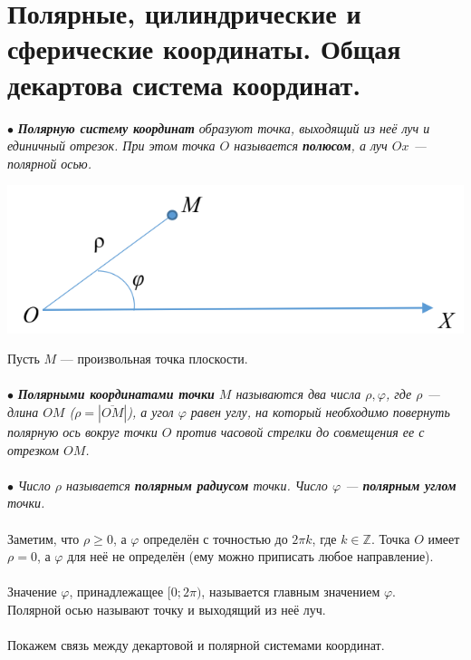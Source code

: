 \section{Полярные, цилиндрические и сферические координаты. Общая декартова система координат.}
$\bullet$ \textit{\textbf{Полярную систему координат} образуют точка, выходящий из неё луч и единичный отрезок. При этом точка $O$ называется \textbf{полюсом}, а луч $Ox$ --- полярной осью.}\begin{center}
	\includegraphics[scale=0.4]{images/polar.png}
\end{center}
Пусть $M$ --- произвольная точка плоскости.\\\\
$\bullet$ \textit{\textbf{Полярными координатами точки} $M$ называются два числа $\rho, \varphi$, где $\rho$ --- длина $OM$ ($\rho = |\overline{OM}|$), а угол $\varphi$ равен углу, на который необходимо повернуть полярную ось вокруг точки $O$ против часовой стрелки до совмещения ее с отрезком $OM$.}\\\\
$\bullet$ \textit{Число $\rho$ называется \textbf{полярным радиусом} точки. Число $\varphi$ --- \textbf{полярным углом} точки.}\\\\
Заметим, что $\rho \geqslant 0$, а $\varphi$ определён с точностью до $2\pi k$, где $k\in \mathbb{Z}$. Точка $O$ имеет $\rho = 0$, а $\varphi$ для неё не определён (ему можно приписать любое направление).\\\\
Значение $\varphi$, принадлежащее $[0;2\pi)$, называется главным значением $\varphi$.\\
Полярной осью называют точку и выходящий из неё луч.\\\\
Покажем связь между декартовой и полярной системами координат.\\
